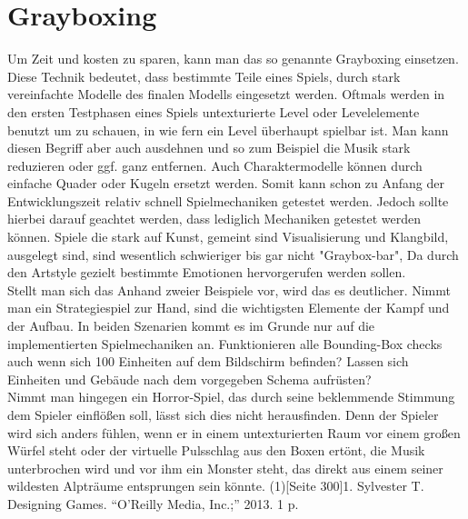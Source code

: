 \chapter{Grayboxing}
\label{cha:ext_grayboxing}

Um Zeit und kosten zu sparen, kann man das so genannte Grayboxing einsetzen. Diese Technik bedeutet, dass bestimmte Teile eines Spiels, durch stark vereinfachte Modelle des finalen Modells eingesetzt werden. Oftmals werden in den ersten Testphasen eines Spiels untexturierte Level oder Levelelemente benutzt um zu schauen, in wie fern ein Level überhaupt spielbar ist. Man kann diesen Begriff aber auch ausdehnen und so zum Beispiel die Musik stark reduzieren oder ggf. ganz entfernen. Auch Charaktermodelle können durch einfache Quader oder Kugeln ersetzt werden. Somit kann schon zu Anfang der Entwicklungszeit relativ schnell Spielmechaniken getestet werden. Jedoch sollte hierbei darauf geachtet werden, dass lediglich Mechaniken getestet werden können. Spiele die stark auf Kunst, gemeint sind Visualisierung und Klangbild, ausgelegt sind, sind wesentlich schwieriger bis gar nicht "Graybox-bar", Da durch den Artstyle gezielt bestimmte Emotionen hervorgerufen werden sollen. \\ Stellt man sich das Anhand zweier Beispiele vor, wird das es deutlicher. Nimmt man ein Strategiespiel zur Hand, sind die wichtigsten Elemente der Kampf und der Aufbau. In beiden Szenarien kommt es im Grunde nur auf die implementierten Spielmechaniken an. Funktionieren alle Bounding-Box checks auch wenn sich 100 Einheiten auf dem Bildschirm befinden? Lassen sich Einheiten und Gebäude nach dem vorgegeben Schema aufrüsten? \\ Nimmt man hingegen ein Horror-Spiel, das durch seine beklemmende Stimmung dem Spieler einflößen soll, lässt sich dies nicht herausfinden. Denn der Spieler wird sich anders fühlen, wenn er in einem untexturierten Raum vor einem großen Würfel steht oder der virtuelle Pulsschlag aus den Boxen ertönt, die Musik unterbrochen wird und vor ihm ein Monster steht, das direkt aus einem seiner wildesten Alpträume entsprungen sein könnte. (1)[Seite 300]1.	Sylvester T. Designing Games. “O'Reilly Media, Inc.;” 2013. 1 p. 

